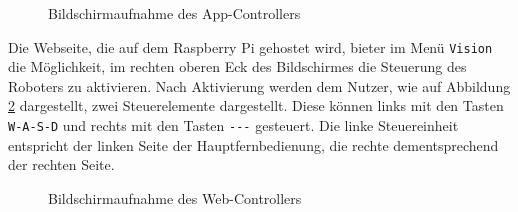\begin{figure}[h]
    \caption{Bildschirmaufnahme des App-Controllers}\label{fig:app-controller}
\end{figure}


Die Webseite, die auf dem Raspberry Pi gehostet wird, bieter im Menü \texttt{Vision} die Möglichkeit, im rechten
oberen Eck des Bildschirmes die Steuerung des Roboters zu aktivieren.
Nach Aktivierung werden dem Nutzer, wie auf Abbildung \ref{fig:web-controller} dargestellt, zwei Steuerelemente dargestellt.
Diese können links mit den Tasten \texttt{W-A-S-D} und rechts mit den Tasten \texttt{\textuparrow -\textleftarrow -\textdownarrow -\textrightarrow}
gesteuert.
Die linke Steuereinheit entspricht der linken Seite der Hauptfernbedienung, die rechte dementsprechend der rechten Seite.

\begin{figure}[h]
    \caption{Bildschirmaufnahme des Web-Controllers}\label{fig:web-controller}
\end{figure}


